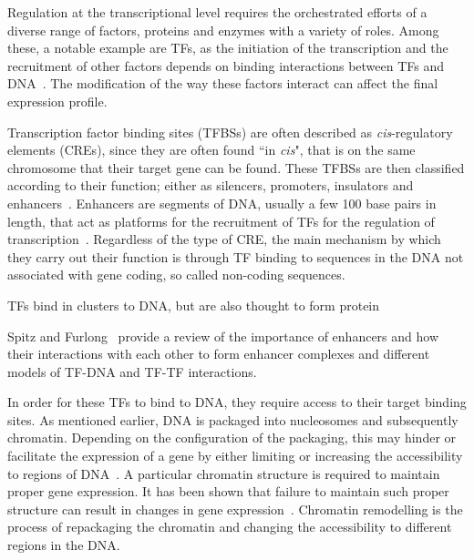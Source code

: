 

        Regulation at the transcriptional level requires the orchestrated efforts of a diverse range of factors, proteins and enzymes with a variety of roles. Among these, a notable example are TFs, as the initiation of the transcription and the recruitment of other factors depends on binding interactions between TFs and DNA~\cite{lemon2000orchestrated}. The modification of the way these factors interact can affect the final expression profile. 
        
        Transcription factor binding sites (TFBSs) are often described as \emph{cis}-regulatory elements (CREs), since they are often found ``in \emph{cis}", that is on the same chromosome that their target gene can be found. These TFBSs are then classified according to their function; either as silencers, promoters, insulators and enhancers~\cite{gaszner2006insulators, gross1988nuclease, li1999locus}. Enhancers are segments of DNA, usually a few 100 base pairs in length, that act as platforms for the recruitment of TFs for the regulation of transcription~\cite{spitz2012transcription}. Regardless of the type of CRE, the main mechanism by which they carry out their function is through TF binding to sequences in the DNA not associated with gene coding, so called non-coding sequences. 
        
        TFs bind in clusters to DNA, but are also thought to form protein 
        
        Spitz and Furlong~\cite{spitz2012transcription} provide a review of the importance of enhancers and how their interactions with each other to form enhancer complexes and different models of TF-DNA and TF-TF interactions. 
        
        In order for these TFs to bind to DNA, they require access to their target binding sites. As mentioned earlier, DNA is packaged into nucleosomes and subsequently chromatin. Depending on the configuration of the packaging, this may hinder or facilitate the expression of a gene by either limiting or increasing the accessibility to regions of DNA~\cite{li2007role}. A particular chromatin structure is required to maintain proper gene expression. It has been shown that failure to maintain such proper structure can result in changes in gene expression~\cite{ehrlich2001dna}. Chromatin remodelling is the process of repackaging the chromatin and changing the accessibility to different regions in the DNA. %

